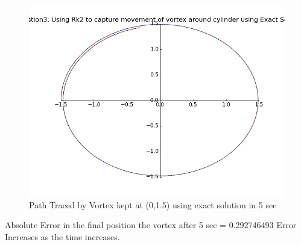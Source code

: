 \documentclass{article}
\begin{document}
\begin{figure}[H]  \label{figure}
\includegraphics[width=12cm]{q3_exact.png}
\caption{Path Traced by Vortex kept at (0,1.5) using exact solution in 5 sec}
\label{figure:}
\end{figure}

Absolute Error in the final position the vortex after 5 sec = 0.292746493
Error Increases as the time increases.
 
  
\end{document}
